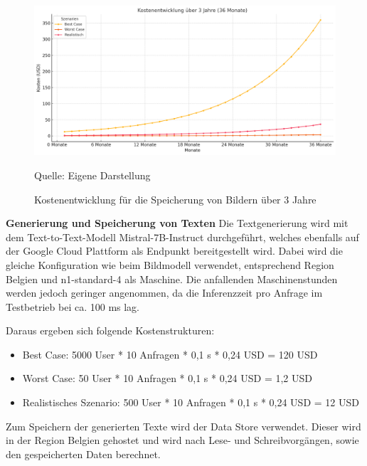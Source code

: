 \begin{figure}[htbp]
    \includegraphics[width=\textwidth, height=\textheight, keepaspectratio]{abbildungen/KostenSpeicher}
    \caption{Kostenentwicklung für die Speicherung von Bildern über 3 Jahre}
    \label{fig:KostenentwicklungSpeicher}
    \raggedright Quelle: Eigene Darstellung
\end{figure}

\textbf{Generierung und Speicherung von Texten}\newline
Die Textgenerierung wird mit dem Text-to-Text-Modell Mistral-7B-Instruct durchgeführt, welches ebenfalls auf der Google Cloud Plattform als Endpunkt bereitgestellt wird.
Dabei wird die gleiche Konfiguration wie beim Bildmodell verwendet, entsprechend Region Belgien und n1-standard-4 als Maschine.
Die anfallenden Maschinenstunden werden jedoch geringer angenommen, da die Inferenzzeit pro Anfrage im Testbetrieb bei ca. 100 ms lag.

Daraus ergeben sich folgende Kostenstrukturen:
\begin{itemize}
    \item Best Case: 5000 User * 10 Anfragen * 0,1 s * 0,24 \ac{USD} = 120 \ac{USD}
    \item Worst Case: 50 User * 10 Anfragen * 0,1 s * 0,24 \ac{USD} = 1,2 \ac{USD}
    \item Realistisches Szenario: 500 User * 10 Anfragen * 0,1 s * 0,24 \ac{USD} = 12 \ac{USD}
\end{itemize}

Zum Speichern der generierten Texte wird der Data Store verwendet.
Dieser wird in der Region Belgien gehostet und wird nach Lese- und Schreibvorgängen, sowie den gespeicherten Daten berechnet.

